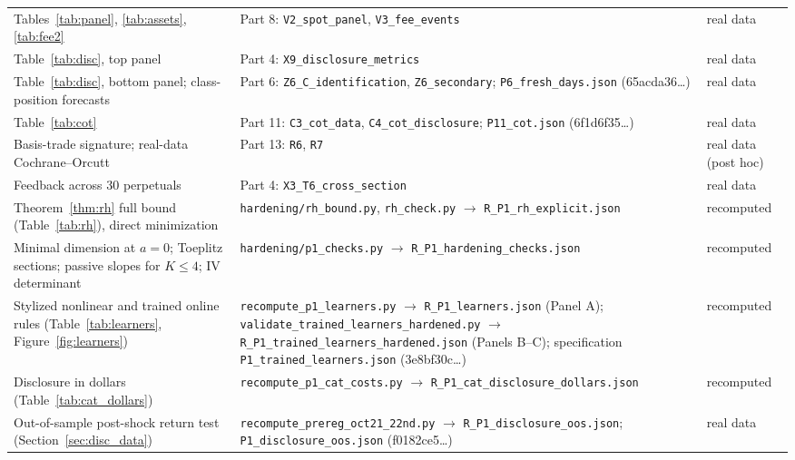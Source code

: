 \begin{longtable}{p{}p{}p{}}
Tables~\ref{tab:panel}, \ref{tab:assets}, \ref{tab:fee2} & Part 8: \nolinkurl{V2_spot_panel}, \nolinkurl{V3_fee_events} & real data\\
Table~\ref{tab:disc}, top panel & Part 4: \nolinkurl{X9_disclosure_metrics} & real data\\
Table~\ref{tab:disc}, bottom panel; class-position forecasts & Part 6: \nolinkurl{Z6_C_identification}, \nolinkurl{Z6_secondary}; \nolinkurl{P6_fresh_days.json} (65acda36\ldots) & real data\\
Table~\ref{tab:cot} & Part 11: \nolinkurl{C3_cot_data}, \nolinkurl{C4_cot_disclosure}; \nolinkurl{P11_cot.json} (6f1d6f35\ldots) & real data\\
Basis-trade signature; real-data Cochrane--Orcutt & Part 13: \nolinkurl{R6}, \nolinkurl{R7} & real data (post hoc)\\
Feedback across 30 perpetuals & Part 4: \nolinkurl{X3_T6_cross_section} & real data\\
Theorem~\ref{thm:rh} full bound (Table~\ref{tab:rh}), direct minimization & \nolinkurl{hardening/rh_bound.py}, \nolinkurl{rh_check.py} $\to$ \nolinkurl{R_P1_rh_explicit.json} & recomputed\\
Minimal dimension at $a=0$; Toeplitz sections; passive slopes for $K\le4$; IV determinant & \nolinkurl{hardening/p1_checks.py} $\to$ \nolinkurl{R_P1_hardening_checks.json} & recomputed\\
Stylized nonlinear and trained online rules (Table~\ref{tab:learners}, Figure~\ref{fig:learners}) & \texttt{recompute\_\allowbreak p1\_\allowbreak learners.py} $\to$ \texttt{R\_P1\_\allowbreak learners.json} (Panel A); \texttt{validate\_\allowbreak trained\_\allowbreak learners\_\allowbreak hardened.py} $\to$ \texttt{R\_P1\_\allowbreak trained\_\allowbreak learners\_\allowbreak hardened.json} (Panels B--C); specification \texttt{P1\_\allowbreak trained\_\allowbreak learners.json} (3e8bf30c\ldots) & recomputed\\
Disclosure in dollars (Table~\ref{tab:cat_dollars}) & \texttt{recompute\_\allowbreak p1\_\allowbreak cat\_\allowbreak costs.py} $\to$ \texttt{R\_P1\_\allowbreak cat\_\allowbreak disclosure\_\allowbreak dollars.json} & recomputed\\
Out-of-sample post-shock return test (Section~\ref{sec:disc_data}) & \texttt{recompute\_\allowbreak prereg\_\allowbreak oct21\_\allowbreak 22nd.py} $\to$ \texttt{R\_P1\_\allowbreak disclosure\_\allowbreak oos.json}; \texttt{P1\_\allowbreak disclosure\_\allowbreak oos.json} (f0182ce5\ldots) & real data\\

\end{longtable}
